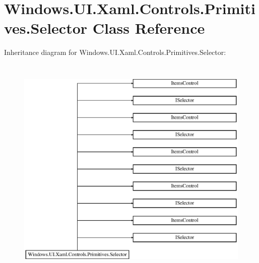 \hypertarget{class_windows_1_1_u_i_1_1_xaml_1_1_controls_1_1_primitives_1_1_selector}{}\section{Windows.\+U\+I.\+Xaml.\+Controls.\+Primitives.\+Selector Class Reference}
\label{class_windows_1_1_u_i_1_1_xaml_1_1_controls_1_1_primitives_1_1_selector}
Inheritance diagram for Windows.\+U\+I.\+Xaml.\+Controls.\+Primitives.\+Selector\+:\begin{figure}[H]
\begin{center}
\leavevmode
\includegraphics[height=11.000000cm]{class_windows_1_1_u_i_1_1_xaml_1_1_controls_1_1_primitives_1_1_selector}
\end{center}
\end{figure}

